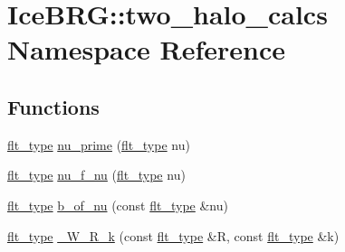 \hypertarget{namespaceIceBRG_1_1two__halo__calcs}{}\section{Ice\+B\+R\+G\+:\+:two\+\_\+halo\+\_\+calcs Namespace Reference}
\label{namespaceIceBRG_1_1two__halo__calcs}
\subsection*{Functions}
\begin{DoxyCompactItemize}
\item 
\hyperlink{lib_2IceBRG__main_2common_8h_ad0f130a56eeb944d9ef2692ee881ecc4}{flt\+\_\+type} \hyperlink{namespaceIceBRG_1_1two__halo__calcs_a637856cdb19649f65374d1d5d86583ed}{nu\+\_\+prime} (\hyperlink{lib_2IceBRG__main_2common_8h_ad0f130a56eeb944d9ef2692ee881ecc4}{flt\+\_\+type} nu)
\item 
\hyperlink{lib_2IceBRG__main_2common_8h_ad0f130a56eeb944d9ef2692ee881ecc4}{flt\+\_\+type} \hyperlink{namespaceIceBRG_1_1two__halo__calcs_a685c3349747cf2f45ce07ee13a8e58eb}{nu\+\_\+f\+\_\+nu} (\hyperlink{lib_2IceBRG__main_2common_8h_ad0f130a56eeb944d9ef2692ee881ecc4}{flt\+\_\+type} nu)
\item 
\hyperlink{lib_2IceBRG__main_2common_8h_ad0f130a56eeb944d9ef2692ee881ecc4}{flt\+\_\+type} \hyperlink{namespaceIceBRG_1_1two__halo__calcs_a8778132bcc56a2bcddcb4857ede66e64}{b\+\_\+of\+\_\+nu} (const \hyperlink{lib_2IceBRG__main_2common_8h_ad0f130a56eeb944d9ef2692ee881ecc4}{flt\+\_\+type} \&nu)
\item 
\hyperlink{lib_2IceBRG__main_2common_8h_ad0f130a56eeb944d9ef2692ee881ecc4}{flt\+\_\+type} \hyperlink{namespaceIceBRG_1_1two__halo__calcs_adb13081660d28ff9a780080228b7f2c4}{\+\_\+\+W\+\_\+\+R\+\_\+k} (const \hyperlink{lib_2IceBRG__main_2common_8h_ad0f130a56eeb944d9ef2692ee881ecc4}{flt\+\_\+type} \&R, const \hyperlink{lib_2IceBRG__main_2common_8h_ad0f130a56eeb944d9ef2692ee881ecc4}{flt\+\_\+type} \&k)
\end{DoxyCompactItemize}
